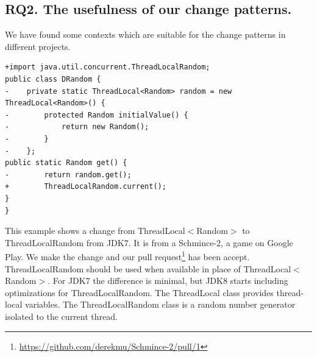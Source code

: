 %
%
%
%
%
%

\subsection{RQ2. The usefulness of our change patterns.}
\label{sec:result:sample}



 We have found some contexts which are suitable for the change patterns in different projects.

\begin{lstlisting}
+import java.util.concurrent.ThreadLocalRandom;
public class DRandom {
-    private static ThreadLocal<Random> random = new ThreadLocal<Random>() {
-        protected Random initialValue() {
-            return new Random();
-        }
-    };
public static Random get() {
-        return random.get();
+        ThreadLocalRandom.current();
}
}
\end{lstlisting}

This example shows a change from ThreadLocal$<$Random$>$ to ThreadLocalRandom from JDK7. It is from a Schmince-2, a game on Google Play. We make the change and our pull request\footnote{\url{https://github.com/derekmu/Schmince-2/pull/1}} has been accept. ThreadLocalRandom should be used when available in place of ThreadLocal$<$Random$>$. For JDK7 the difference is minimal, but JDK8 starts including optimizations for ThreadLocalRandom. The ThreadLocal class provides thread-local variables. The ThreadLocalRandom class is a random number generator isolated to the current thread.

